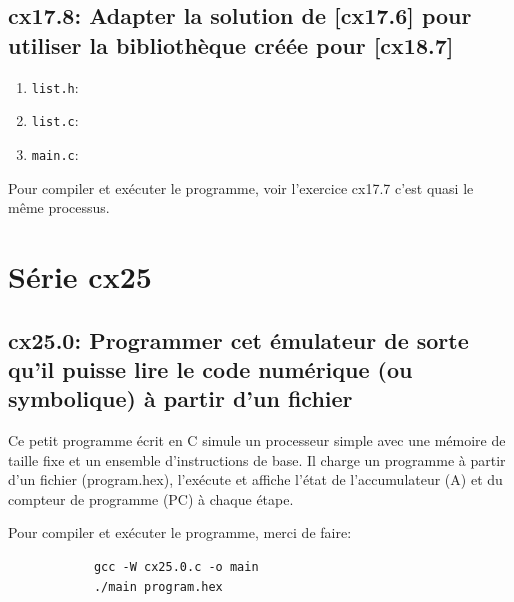 \documentclass[a4paper,11pt]{article}
\begin{document}
      \subsection{cx17.8: Adapter la solution de [cx17.6] pour utiliser la bibliothèque créée pour [cx18.7]}

        \begin{enumerate}
          \item \texttt{list.h}:
            
          \item \texttt{list.c}:
            
          \item \texttt{main.c}:
            
        \end{enumerate}

        \bigskip
        \noindent Pour compiler et exécuter le programme, voir l'exercice cx17.7 c'est quasi le même processus.

    \newpage
    \section{Série cx25}

      \subsection{cx25.0: Programmer cet émulateur de sorte qu'il puisse lire le code numérique (ou symbolique) à partir d'un fichier}

        \bigskip
        \noindent Ce petit programme écrit en C simule un processeur simple avec une mémoire de taille fixe et un ensemble d'instructions de base. 
        Il charge un programme à partir d'un fichier (program.hex), l'exécute et affiche l'état de l'accumulateur (A) et du compteur de programme (PC) 
        à chaque étape.

        

        \bigskip
        \noindent Pour compiler et exécuter le programme, merci de faire:
        \begin{tcolorbox}[colback=lightgray!6, colframe=black, left=-20mm, right=5mm, top=2mm, bottom=-2mm, boxrule=0.1mm]
          \begin{verbatim}
            gcc -W cx25.0.c -o main
            ./main program.hex
          \end{verbatim}
        \end{tcolorbox}
\end{document}
